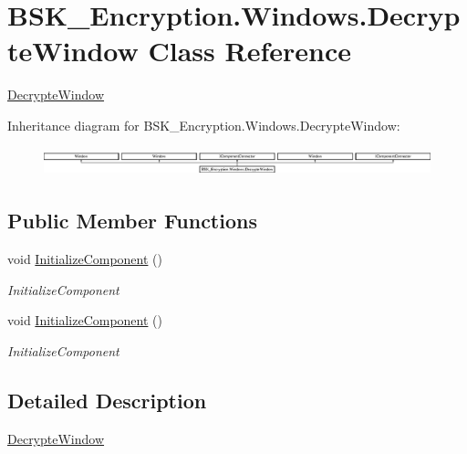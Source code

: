 \hypertarget{class_b_s_k___encryption_1_1_windows_1_1_decrypte_window}{}\section{B\+S\+K\+\_\+\+Encryption.\+Windows.\+Decrypte\+Window Class Reference}
\label{class_b_s_k___encryption_1_1_windows_1_1_decrypte_window}


\mbox{\hyperlink{class_b_s_k___encryption_1_1_windows_1_1_decrypte_window}{Decrypte\+Window}}  


Inheritance diagram for B\+S\+K\+\_\+\+Encryption.\+Windows.\+Decrypte\+Window\+:\begin{figure}[H]
\begin{center}
\leavevmode
\includegraphics[height=0.842105cm]{class_b_s_k___encryption_1_1_windows_1_1_decrypte_window}
\end{center}
\end{figure}
\subsection*{Public Member Functions}
\begin{DoxyCompactItemize}
\item 
void \mbox{\hyperlink{class_b_s_k___encryption_1_1_windows_1_1_decrypte_window_aaec082894bb769855c76c4e67d541d71}{Initialize\+Component}} ()
\begin{DoxyCompactList}\small\item\em Initialize\+Component \end{DoxyCompactList}\item 
void \mbox{\hyperlink{class_b_s_k___encryption_1_1_windows_1_1_decrypte_window_aaec082894bb769855c76c4e67d541d71}{Initialize\+Component}} ()
\begin{DoxyCompactList}\small\item\em Initialize\+Component \end{DoxyCompactList}\end{DoxyCompactItemize}


\subsection{Detailed Description}
\mbox{\hyperlink{class_b_s_k___encryption_1_1_windows_1_1_decrypte_window}{Decrypte\+Window}} 

